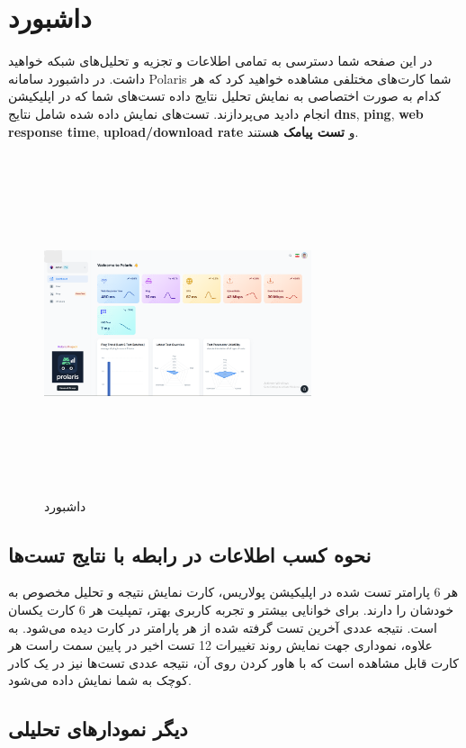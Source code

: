 \documentclass{report}
\begin{document}
\section{داشبورد}
در این صفحه شما دسترسی به تمامی اطلاعات و تجزیه و تحلیل‌های شبکه خواهید داشت. در داشبورد سامانه Polaris شما کارت‌های مختلفی مشاهده خواهید کرد که هر کدام به صورت اختصاصی به نمایش تحلیل نتایج داده تست‌های شما که در اپلیکیشن انجام دادید می‌پردازند. تست‌های نمایش داده شده شامل نتایج \textbf{dns}, \textbf{ping}, \textbf{web response time}, \textbf{upload/download rate} و \textbf{تست پیامک} هستند.
 \begin{figure}[ht]
	\centering
	\includegraphics[width=0.7\textwidth,height=10cm,keepaspectratio]{Pic/dashboard}
	\caption{ داشبورد}
	\label{fig:dashboard}
\end{figure}

\subsection{نحوه کسب اطلاعات در رابطه با نتایج تست‌ها}
هر 6 پارامتر تست شده در اپلیکیشن پولاریس، کارت نمایش نتیجه و تحلیل مخصوص به خودشان را دارند. برای خوانایی بیشتر و تجربه کاربری بهتر، تمپلیت هر 6 کارت یکسان است. نتیجه عددی آخرین تست گرفته شده از هر پارامتر در کارت دیده می‌شود. به علاوه، نموداری جهت نمایش روند تغییرات 12 تست اخیر در پایین سمت راست هر کارت قابل مشاهده است که با هاور کردن روی آن، نتیجه عددی تست‌ها نیز در یک کادر کوچک به شما نمایش داده می‌شود.

\subsection{دیگر نمودارهای تحلیلی}
\end{document}
